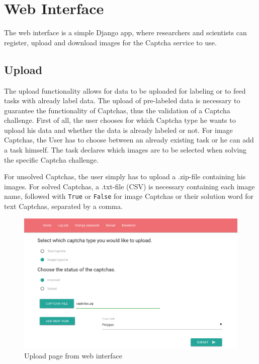 \section{Web Interface}
\label{sec:web_interface}

The web interface is a simple Django app, where researchers and scientists can register, upload and download images for the Captcha service to use.

\subsection{Upload}

The upload functionality allows for data to be uploaded for labeling or to feed tasks with already label data. The upload of pre-labeled data is necessary to guarantee the functionality of Captchas, thus the validation of a Captcha challenge.
First of all, the user chooses for which Captcha type he wants to upload his data and whether the data is already labeled or not.
For image Captchas, the User has to choose between an already existing task or he can add a task himself. The task declares which images are to be selected when solving the specific Captcha challenge.

For unsolved Captchas, the user simply has to upload a .zip-file containing his images.
For solved Captchas, a .txt-file (CSV) is necessary containing each image name, followed with \verb|True| or \verb|False| for image Captchas or their solution word for text Captchas, separated by a comma.
\begin{figure}[H]
\centering
\includegraphics[width=1\linewidth]{content/figures/upload.png}
\caption{Upload page from web interface}
\label{fig:upload}
\end{figure}


